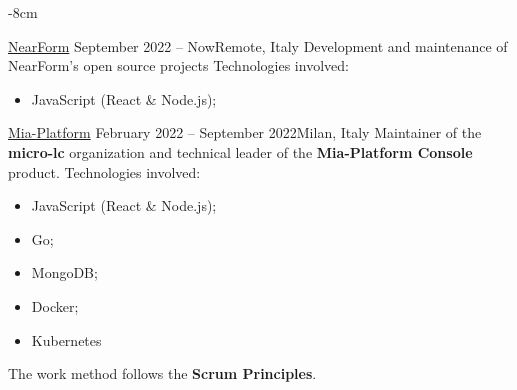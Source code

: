 \documentclass[10pt,a4paper]{altacv}
\begin{document}


\begin{adjustwidth}{}{-8cm}
\makecvheader
\end{adjustwidth}


{\href{https://www.nearform.com/}{NearForm}}
{September 2022 -- Now}{Remote, Italy}
Development and maintenance of NearForm's open source projects
\newline\newline
Technologies involved:
\begin{itemize}
	\item JavaScript (React \& Node.js);
\end{itemize}

\divider

{\href{https://mia-platform.eu/}{Mia-Platform}}
{February 2022 -- September 2022}{Milan, Italy}
Maintainer of the \textbf{micro-lc} organization and technical leader of the \textbf{Mia-Platform Console} product.
\newline\newline
Technologies involved:
\begin{itemize}
	\item JavaScript (React \& Node.js);
	\item Go;
	\item MongoDB;
	\item Docker;
	\item Kubernetes
\end{itemize}

The work method follows the \textbf{Scrum Principles}.
\divider
\end{document}
